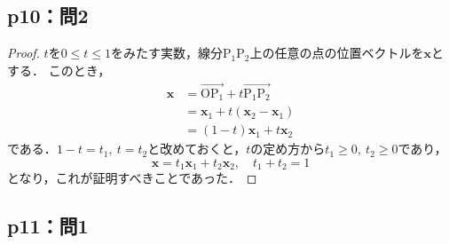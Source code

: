 \documentclass[uplatex,dvipdfmx,a4paper,11pt,fleqn]{jsarticle}
\begin{document}
\subsection*{p10：問2}

\begin{tleftbar}
    \begin{proof}
        $t$を$0 \le t \le 1$をみたす実数，線分$\mathrm{P_1 P_2}$上の任意の点の位置ベクトルを$\bm{x}$とする．
        このとき，
        \begin{align*}
            \bm{x} & = \overrightarrow{\mathrm{O P_1}}+t\overrightarrow{\mathrm{P_1 P_2}} \\
            & = \bm{x}_1 + t (\bm{x}_2 - \bm{x}_1) \\
             &= (1-t) \bm{x}_1 + t \bm{x}_2
        \end{align*}
        である．$1-t = t_1,~t=t_2$と改めておくと，$t$の定め方から$t_1 \ge 0,~t_2 \ge 0$であり，
        \[
            \bm{x}= t_1 \bm{x}_1 + t_2 \bm{x}_2 ,\quad t_1 + t_2 =1
        \]
        となり，これが証明すべきことであった．
    \end{proof}
\end{tleftbar}

\newpage
\subsection*{p11：問1}
\end{document}
